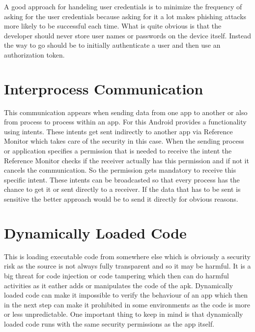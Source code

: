 A good approach for handeling user credentials is to minimize the frequency of asking for the user credentials because asking for it a lot makes phishing attacks more likely to be successful each time.
What is quite obvious is that the developer should never store user names or passwords on the device itself. Instead the way to go should be to initially authenticate a user and then use an authorization token.

\section{Interprocess Communication}
\label{chp:howto:sec:interprocessCommunication}

This communication appears when sending data from one app to another or also from process to process within an app.
For this Android provides a functionality using intents. These intents get sent indirectly to another app via Reference Monitor which takes care of the security in this case. When the sending process or application specifies a permission that is needed to receive the intent the Reference Monitor checks if the receiver actually has this permission and if not it cancels the communication. So the permission gets mandatory to receive this specific intent.
These intents can be broadcasted so that every process has the chance to get it or sent directly to a receiver. If the data that has to be sent is sensitive the better approach would be to send it directly for obvious reasons.

\section{Dynamically Loaded Code}
\label{chp:howto:sec:dynamicallyLoadedCode}

This is loading executable code from somewhere else which is obviously a security risk as the source is not always fully transparent and so it may be harmful.
It is a big threat for code injection or code tampering which then can do harmful activities as it eather adds or manipulates the code of the apk.
Dynamically loaded code can make it impossible to verify the behaviour of an app which then in the next step can make it prohibited in some environments as the code is more or less unpredictable.
One important thing to keep in mind is that dynamically loaded code runs with the same security permissions as the app itself.
